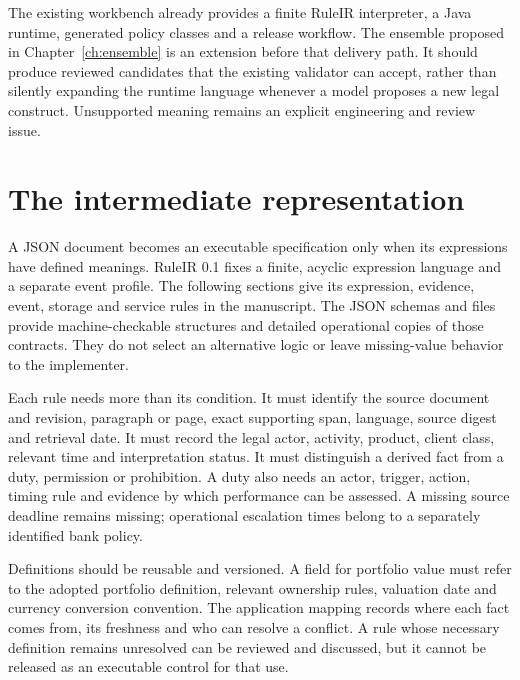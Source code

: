The existing workbench already provides a finite RuleIR interpreter, a Java
runtime, generated policy classes and a release workflow. The ensemble proposed
in Chapter~\ref{ch:ensemble} is an extension before that delivery path. It should
produce reviewed candidates that the existing validator can accept, rather than
silently expanding the runtime language whenever a model proposes a new legal
construct. Unsupported meaning remains an explicit engineering and review issue.

\section{The intermediate representation}
\label{merge:P-03-product:02}


A JSON document becomes an executable specification only when its expressions
have defined meanings. RuleIR 0.1 fixes a finite, acyclic expression language and
a separate event profile. The following sections give its expression, evidence,
event, storage and service rules in the manuscript. The JSON schemas and
 files provide machine-checkable structures and detailed
operational copies of those contracts. They do not select an alternative logic
or leave missing-value behavior to the implementer.

Each rule needs more than its condition. It must identify the source document and
revision, paragraph or page, exact supporting span, language, source digest and
retrieval date. It must record the legal actor, activity, product, client class,
relevant time and interpretation status. It must distinguish a derived fact from
a duty, permission or prohibition. A duty also needs an actor, trigger, action,
timing rule and evidence by which performance can be assessed. A missing source
deadline remains missing; operational escalation times belong to a separately
identified bank policy.


Definitions should be reusable and versioned. A field for portfolio value must
refer to the adopted portfolio definition, relevant ownership rules, valuation
date and currency conversion convention. The application mapping records where
each fact comes from, its freshness and who can resolve a conflict. A rule whose
necessary definition remains unresolved can be reviewed and discussed, but it
cannot be released as an executable control for that use.

